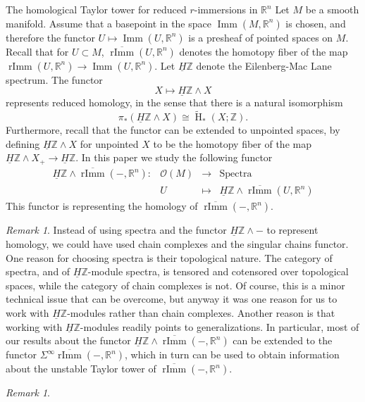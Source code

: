 \documentclass[12pt]{amsart}
\newcommand{\R}{{\mathbb R}}
\newcommand{\Z}{{\mathbb Z}}
\newcommand{\Imm}{\operatorname{Imm}}
\newcommand{\rImm}{\operatorname{rImm}}
\newcommand{\rbar}{\overline{\rImm}}
\newcommand{\Ho}{\operatorname{H}}
\newcommand{\HZ}{\underline{H}\Z}
\newcommand{\calO}{{\mathcal{O}}}
\theoremstyle{plain}
\theoremstyle{definition}
\theoremstyle{remark}
\newtheorem{rem}[thm]{Remark}
\begin{document}
\begin{section}{The homological Taylor tower for reduced $r$-immersions in $\mathbb R^n$}
Let $M$ be a smooth manifold. Assume that a basepoint in the space $\Imm(M, \R^n)$ is chosen, and therefore the functor $U\mapsto \Imm(U, \R^n)$ is a presheaf of pointed spaces on $M$. Recall that for $U\subset M$, $\rbar(U, \R^n)$ denotes the homotopy fiber of the map $\rImm(U, \R^n)\to \Imm(U, \R^n)$. Let $\HZ$ denote the Eilenberg-Mac Lane spectrum. The functor 
\[
X\mapsto \HZ \wedge X
\]
represents reduced homology, in the sense that there is a natural isomorphism
\begin{equation}\label{E:homotopy=homology}
\pi_*(\HZ\wedge X )\cong \widetilde{\Ho}_*(X;\Z).
\end{equation}
Furthermore, recall that the functor can be extended to unpointed spaces, by defining $\HZ \wedge X$ for unpointed $X$ to be the homotopy fiber of the map $\HZ \wedge X_+ \to \HZ$.
In this paper we study the following functor
\[
\begin{array}{cccc}
\HZ\wedge \overline{\rImm}(-,\R^n) \colon & \calO(M) & \to &\text{Spectra} \\[5pt]
& U & \mapsto & \HZ \wedge \overline{\rImm}(U,\R^n)
\end{array}
\]
This functor is representing the homology of $\rbar(-, \R^n)$.
\begin{rem}\label{R:Quillen}
Instead of using spectra and the functor $\HZ\wedge -$ to represent homology, we could have used chain complexes and the singular chains functor. One reason for choosing spectra is their topological nature. The category of spectra, and of $\HZ$-module spectra, is tensored and cotensored over topological spaces, while the category of chain complexes is not. Of course, this is a minor technical issue that can be overcome, but anyway it was one reason for us to work with $\HZ$-modules rather than chain complexes. Another reason is that working with $\HZ$-modules readily points to generalizations. In particular, most of our results about the functor $\HZ \wedge \rbar(-, \R^n)$ can be extended to the functor $\Sigma^\infty \rbar(-, \R^n)$, which in turn can be used to obtain information about the unstable Taylor tower of $\rbar(-, \R^n)$.
\end{rem}
\begin{rem}

\end{rem}
\end{section}
\end{document}

